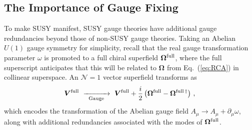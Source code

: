 \documentclass[12pt,document,nofootinbib,superscriptaddress,onecolumn,preprintnumbers,balancelastpage]{article}
\newcommand{\full}{\text{full}}
\newcommand{\gauge}{\,\,\xrightarrow[\hspace{5pt}\text{Gauge}\hspace{5pt}]{}\,\,}
\DeclareRobustCommand{\Eq}[1]{Eq.~(\ref{#1})}
\newcommand{\bV}{ \boldsymbol V}
\newcommand{\RCA}{\boldsymbol{\Omega}}
\begin{document}
\begin{spacing}{1.2}
\subsection{The Importance of Gauge Fixing}
\label{eq:gaugefixing}

To make SUSY manifest, SUSY gauge theories have additional gauge redundancies beyond those of non-SUSY gauge theories.
%
Taking an Abelian $U(1)$ gauge symmetry for simplicity, recall that the real gauge transformation parameter $\omega$ is promoted to a full chiral superfield $\RCA^{\rm full}$, where the full superscript anticipates that this will be related to $\RCA$ from \Eq{eq:RCA} in collinear superspace.
%
An $\mathcal{N} = 1$ vector superfield transforms as 
%
\begin{align}
\label{eq:Vfullgauge}
\bV^{\rm full} \gauge \bV^{\rm full} + \frac{i}{2} \left(\RCA^{\rm full} - \RCA^{ \full\, \dagger}\right) \, ,
\end{align}
%
which encodes the transformation of the Abelian gauge field $A_\mu \to A_\mu + \partial_\mu \omega$, along with additional redundancies associated with the modes of  $\RCA^{\rm full}$.
 


\end{spacing}
\end{document}
